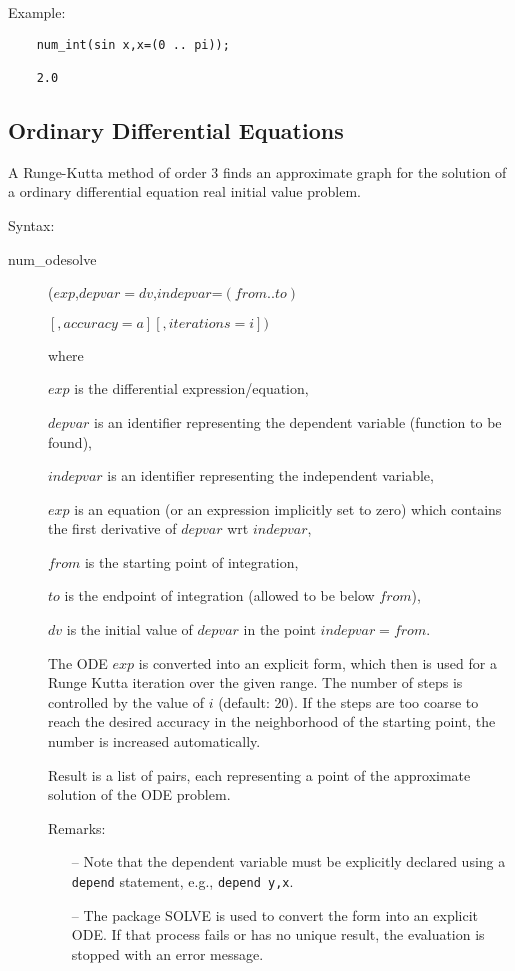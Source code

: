 Example:

\begin{verbatim}
    num_int(sin x,x=(0 .. pi));

    2.0
\end{verbatim}

\subsection{Ordinary Differential Equations}
\hypertarget{operator:NUM_ODESOLVE}{}

A Runge-Kutta method of order 3 finds an approximate graph for
the solution of a ordinary differential equation
real initial value problem.

Syntax:
\begin{description}
\item[num\_odesolve]($exp$,$depvar=dv$,$indepvar$=$(from .. to)$

$                   [,accuracy=a][,iterations=i]) $

where

$exp$ is the differential expression/equation,

$depvar$ is an identifier representing the dependent variable
(function to be found),

$indepvar$ is an identifier representing the independent variable,

$exp$ is an equation (or an expression implicitly set to zero) which
contains the first derivative of $depvar$ wrt $indepvar$,

$from$ is the starting point of integration,

$to$ is the endpoint of integration (allowed to be below $from$),

$dv$ is the initial value of $depvar$ in the point $indepvar=from$.

The ODE $exp$ is converted into an explicit form, which then is
used for a Runge Kutta iteration over the given range. The
number of steps is controlled by the value of $i$
(default: 20).
If the steps are too coarse to reach the desired
accuracy in the neighborhood of the starting point, the number is
increased automatically.

Result is a list of pairs, each representing a point of the
approximate solution of the ODE problem.

Remarks:
\begin{enumerate}

  \item[--]
Note that the dependent variable must be explicitly declared
using a \texttt{depend} statement, e.g., \texttt{depend y,x}.
\item[--] The \REDUCE{} package \textsc{SOLVE} is used to convert the form into
an explicit ODE. If that process fails or has no unique result,
the evaluation is stopped with an error message.

\end{enumerate}

\end{description}

